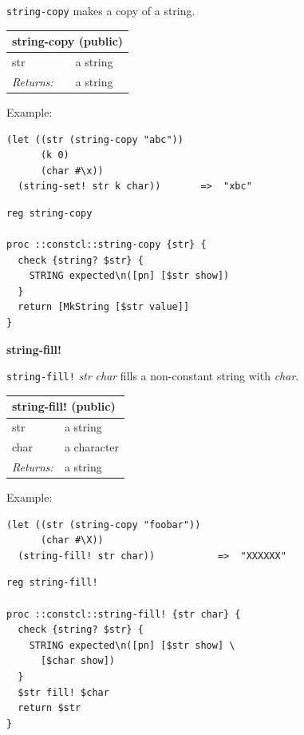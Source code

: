 \documentclass[twoside,9pt]{report}
\begin{document}
\texttt{string-copy} makes a copy of a string.

\begin{tabular}{ |l l| }
\hline
\multicolumn{2}{|l|}{string-copy (public)} \\
\hline
str & a string \\
\textit{Returns:} & a string \\
\hline
\end{tabular}


Example:

\noindent\makebox[\linewidth]{\rule{\linewidth}{0.4pt}}
\begin{lstlisting}
(let ((str (string-copy "abc"))
      (k 0)
      (char #\x))
  (string-set! str k char))       =>  "xbc"
\end{lstlisting}
\noindent\makebox[\linewidth]{\rule{\linewidth}{0.4pt}}
\noindent\makebox[\linewidth]{\rule{\linewidth}{0.4pt}}
\begin{lstlisting}
reg string-copy
 
proc ::constcl::string-copy {str} {
  check {string? $str} {
    STRING expected\n([pn] [$str show])
  }
  return [MkString [$str value]]
}
\end{lstlisting}
\noindent\makebox[\linewidth]{\rule{\linewidth}{0.4pt}}

\textbf{string-fill!}


\texttt{string-fill!} \emph{str} \emph{char} fills a non-constant string with \emph{char}.

\begin{tabular}{ |l l| }
\hline
\multicolumn{2}{|l|}{string-fill! (public)} \\
\hline
str & a string \\
char & a character \\
\textit{Returns:} & a string \\
\hline
\end{tabular}


Example:

\noindent\makebox[\linewidth]{\rule{\linewidth}{0.4pt}}
\begin{lstlisting}
(let ((str (string-copy "foobar"))
      (char #\X))
  (string-fill! str char))           =>  "XXXXXX"
\end{lstlisting}
\noindent\makebox[\linewidth]{\rule{\linewidth}{0.4pt}}
\noindent\makebox[\linewidth]{\rule{\linewidth}{0.4pt}}
\begin{lstlisting}
reg string-fill!
 
proc ::constcl::string-fill! {str char} {
  check {string? $str} {
    STRING expected\n([pn] [$str show] \
      [$char show])
  }
  $str fill! $char
  return $str
}
\end{lstlisting}
\noindent\makebox[\linewidth]{\rule{\linewidth}{0.4pt}}
\end{document}
